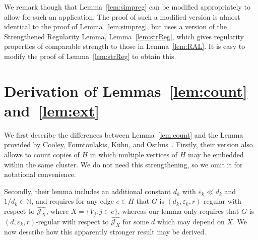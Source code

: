 \documentclass[12pt,a4paper]{amsart}
\let\eps\varepsilon
\newcommand{\NATS}{\mathbb{N}}
\newcommand{\cJ}{\mathcal{J}}
\begin{document}
We remark though that Lemma~\ref{lem:simpreg} can
be modified appropriately to allow for such an application. The proof of
such a modified version is almost identical to the proof of
Lemma~\ref{lem:simpreg}, but uses a version of the Strengthened Regularity
Lemma, Lemma~\ref{lem:strReg}, which
gives regularity properties of comparable strength to those in
Lemma~\ref{lem:RAL}. It is easy to modify the proof of
Lemma~\ref{lem:strReg} to obtain this.


\appendix

\section{Derivation of Lemmas~\ref{lem:count} and~\ref{lem:ext}}\label{app:count}

We first describe the differences between Lemma~\ref{lem:count} and the
Lemma provided by Cooley, Fountoulakis, K\"uhn, and
Osthus~\cite[Lemma~4]{CFKO}.  Firstly, their version also allows to count
copies of $H$ in which multiple vertices of $H$ may be embedded within the
same cluster. We do not need this strengthening, so we omit it for
notational convenience. 

Secondly, their lemma includes an additional constant $d_k$ with $\eps_k
\ll d_k$ and $1/d_k \in \NATS$, and requires for any edge $e \in H$ that
$G$ is $(d_k,\eps_k, r)$-regular with respect to $\hat{\cJ_X}$, where $X =
\{V_j : j \in e\}$, whereas our lemma only requires that $G$ is $(d,\eps_k,
r)$-regular with respect to $\hat{\cJ_X}$ for some $d$ which may depend on
$X$. We now describe how this apparently stronger result may be derived.
\end{document}
